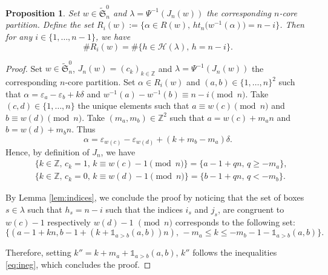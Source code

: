 \documentclass[10pt,a4paper]{article}
\newtheorem{Proposition}[Theorem]{Proposition}
 { \theoremstyle{definition}
\newtheorem{Definition}[Theorem]{Definition}
\newtheorem{Note}[Theorem]{Note}
\newtheorem{Example}[Theorem]{Example}
\newtheorem{Remark}[Theorem]{Remark} }
\numberwithin{equation}{section}
\def\cch{\mathcal H}
\newcommand{\Z}{\mathbb{Z}}
\begin{document}
\begin{Proposition}\label{prop:inversion}
Set $w\in\widetilde{\mathfrak{S}}^0_n$ and $\lambda=\Psi^{-1}(J_n(w))$ the corresponding $n$-core partition. Define the set $R_i(w):=\bigl\lbrace \alpha\in R(w),\, ht_n\bigl(w^{-1}(\alpha)\bigr)=n-i\bigr\rbrace$.
Then for any $i\in\lbrace 1,\dots,n-1\rbrace$, we have
\[\#R_i(w)=\#\lbrace h\in \cch(\lambda),\, h=n-i\rbrace.\]
\end{Proposition}

\begin{proof}
Set $w\in\widetilde{\mathfrak{S}}^0_n$, $J_n(w)=(c_k)_{k\in\Z}$ and $\lambda=\Psi^{-1}(J_n(w))$ the corresponding $n$-core partition. Set $\alpha\in R_i(w)$ and $(a,b)\in\lbrace 1,\dots,n\rbrace^2$ such that $\alpha=\varepsilon_a-\varepsilon_b+k\delta$
and $w^{-1}(a)-w^{-1}(b)\equiv n-i\pmod{n}$. Take $(c,d)\in\lbrace 1,\dots,n\rbrace$ the unique elements such that $a\equiv w(c)\pmod{n}$ and $b\equiv w(d)\pmod{n}$. Take $(m_a,m_b)\in\Z^2$ such that $a=w(c)+m_an$ and $b=w(d)+m_bn$. Thus
\[\alpha=\varepsilon_{w(c)}-\varepsilon_{w(d)}+(k+m_b-m_a)\delta.\]
Hence, by definition of $J_n$, we have
\begin{align*}
&\lbrace k\in \Z,\, c_{k}=1,\, k\equiv w(c)-1\pmod{n}\rbrace=\lbrace a-1+qn,\, q\geq -m_a\rbrace,\\
&\lbrace k\in \Z,\, c_{k}=0,\, k\equiv w(d)-1\pmod{n}\rbrace=\lbrace b-1+qn,\, q< -m_b\rbrace.
\end{align*}


By Lemma \ref{lem:indices}, we conclude the proof by noticing that the set of boxes $s\in\lambda$ such that $h_s=n-i$ such that the indices $i_s$ and $j_s$, are congruent to $w(c)-1$ respectively $w(d)-1$ $\pmod{n}$ corresponds to the following set:
\[\lbrace (a-1+kn,b-1+(k+\mathds{1}_{a>b}(a,b))n),\, -m_a\leq k \leq -m_b-1-\mathds{1}_{a>b}(a,b)\rbrace.
\]


Therefore, setting $k''=k+m_a+\mathds{1}_{a>b}(a,b)$, $k''$ follows the inequalities \eqref{eq:ineg}, which concludes the proof.
\end{proof}
\end{document}
